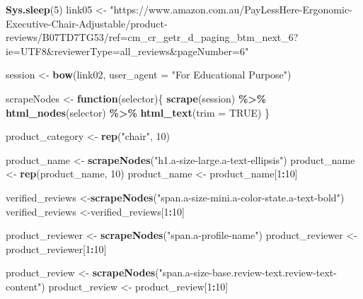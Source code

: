\documentclass[
]{article}
\newenvironment{Shaded}{\begin{snugshade}}{\end{snugshade}}
\newcommand{\AttributeTok}[1]{\textcolor[rgb]{0.13,0.29,0.53}{#1}}
\newcommand{\ConstantTok}[1]{\textcolor[rgb]{0.56,0.35,0.01}{#1}}
\newcommand{\ControlFlowTok}[1]{\textcolor[rgb]{0.13,0.29,0.53}{\textbf{#1}}}
\newcommand{\DecValTok}[1]{\textcolor[rgb]{0.00,0.00,0.81}{#1}}
\newcommand{\FunctionTok}[1]{\textcolor[rgb]{0.13,0.29,0.53}{\textbf{#1}}}
\newcommand{\NormalTok}[1]{#1}
\newcommand{\OtherTok}[1]{\textcolor[rgb]{0.56,0.35,0.01}{#1}}
\newcommand{\SpecialCharTok}[1]{\textcolor[rgb]{0.81,0.36,0.00}{\textbf{#1}}}
\newcommand{\StringTok}[1]{\textcolor[rgb]{0.31,0.60,0.02}{#1}}
\begin{document}
\begin{Shaded}
\begin{Highlighting}[]
   \FunctionTok{Sys.sleep}\NormalTok{(}\DecValTok{5}\NormalTok{)}
\NormalTok{link05 }\OtherTok{\textless{}{-}} \StringTok{"https://www.amazon.com.au/PayLessHere{-}Ergonomic{-}Executive{-}Chair{-}Adjustable/product{-}reviews/B07TD7TG53/ref=cm\_cr\_getr\_d\_paging\_btm\_next\_6?ie=UTF8\&reviewerType=all\_reviews\&pageNumber=6"}


\NormalTok{  session }\OtherTok{\textless{}{-}} \FunctionTok{bow}\NormalTok{(link02,}
               \AttributeTok{user\_agent =} \StringTok{"For Educational Purpose"}\NormalTok{)}

\NormalTok{  scrapeNodes }\OtherTok{\textless{}{-}} \ControlFlowTok{function}\NormalTok{(selector)\{}
    \FunctionTok{scrape}\NormalTok{(session) }\SpecialCharTok{\%\textgreater{}\%}
      \FunctionTok{html\_nodes}\NormalTok{(selector) }\SpecialCharTok{\%\textgreater{}\%}
      \FunctionTok{html\_text}\NormalTok{(}\AttributeTok{trim =} \ConstantTok{TRUE}\NormalTok{)}
\NormalTok{  \}}

\NormalTok{  product\_category }\OtherTok{\textless{}{-}} \FunctionTok{rep}\NormalTok{(}\StringTok{"chair"}\NormalTok{, }\DecValTok{10}\NormalTok{)}

\NormalTok{  product\_name }\OtherTok{\textless{}{-}} \FunctionTok{scrapeNodes}\NormalTok{(}\StringTok{"h1.a{-}size{-}large.a{-}text{-}ellipsis"}\NormalTok{)}
\NormalTok{  product\_name }\OtherTok{\textless{}{-}} \FunctionTok{rep}\NormalTok{(product\_name, }\DecValTok{10}\NormalTok{)}
\NormalTok{  product\_name }\OtherTok{\textless{}{-}}\NormalTok{ product\_name[}\DecValTok{1}\SpecialCharTok{:}\DecValTok{10}\NormalTok{]}
  
\NormalTok{  verified\_reviews }\OtherTok{\textless{}{-}}\FunctionTok{scrapeNodes}\NormalTok{(}\StringTok{"span.a{-}size{-}mini.a{-}color{-}state.a{-}text{-}bold"}\NormalTok{)}
\NormalTok{  verified\_reviews }\OtherTok{\textless{}{-}}\NormalTok{verified\_reviews[}\DecValTok{1}\SpecialCharTok{:}\DecValTok{10}\NormalTok{]}
  
\NormalTok{  product\_reviewer }\OtherTok{\textless{}{-}} \FunctionTok{scrapeNodes}\NormalTok{(}\StringTok{"span.a{-}profile{-}name"}\NormalTok{)}
\NormalTok{  product\_reviewer }\OtherTok{\textless{}{-}}\NormalTok{ product\_reviewer[}\DecValTok{1}\SpecialCharTok{:}\DecValTok{10}\NormalTok{]}
  
\NormalTok{  product\_review }\OtherTok{\textless{}{-}} \FunctionTok{scrapeNodes}\NormalTok{(}\StringTok{"span.a{-}size{-}base.review{-}text.review{-}text{-}content"}\NormalTok{)}
\NormalTok{  product\_review }\OtherTok{\textless{}{-}}\NormalTok{ product\_review[}\DecValTok{1}\SpecialCharTok{:}\DecValTok{10}\NormalTok{]}
  

\end{Highlighting}
\end{Shaded}
\end{document}
